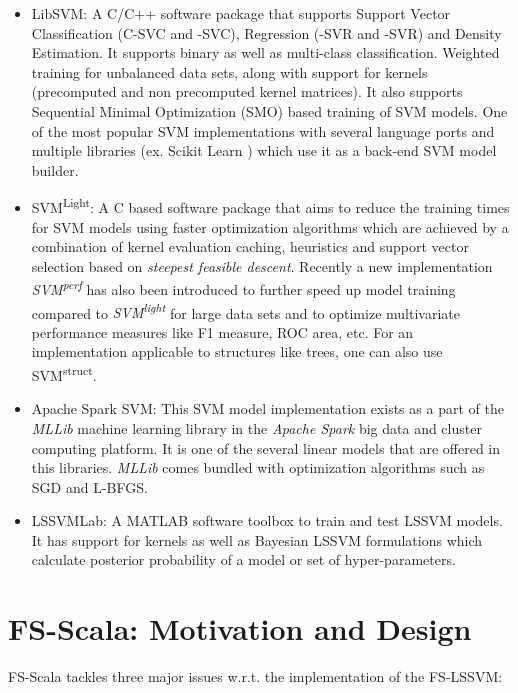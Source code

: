 \begin{itemize}
\item LibSVM: A C/C++ software package that supports Support Vector Classification (C-SVC and \textnu-SVC),  Regression (\textepsilon-SVR and \textnu-SVR) and Density Estimation. It supports binary as well as multi-class classification. Weighted training for unbalanced data sets, along with support for kernels (precomputed and non precomputed kernel matrices). It also supports Sequential Minimal Optimization (SMO) based training of SVM models. One of the most popular SVM implementations with several language ports and multiple libraries (ex. Scikit Learn \cite{scikit-learn}) which use it as a back-end SVM model builder. 

\item SVM\textsuperscript{Light}: A C based software package that aims to reduce the training times for SVM models using faster optimization algorithms which are achieved by a combination of kernel evaluation caching, heuristics and support vector selection based on \textit{steepest feasible descent}. Recently a new implementation \textit{SVM\textsuperscript{perf}} has also been introduced to further speed up model training compared to \textit{SVM\textsuperscript{light}} for large data sets and to optimize multivariate performance measures like F1 measure, ROC area, etc. For an implementation applicable to structures like trees, one can also use SVM\textsuperscript{struct}. 

\item Apache Spark SVM: This SVM model implementation exists as a part of the \textit{MLLib} machine learning library in the \textit{Apache Spark} big data and cluster computing platform. It is one of the several linear models that are offered in this libraries. \textit{MLLib} comes bundled with optimization algorithms such as SGD and L-BFGS.


\item LSSVMLab: A MATLAB software toolbox to train and test LSSVM models. It has support for kernels as well as Bayesian LSSVM formulations which calculate posterior probability of a model or set of hyper-parameters.

\end{itemize}

\section{FS-Scala: Motivation and Design}
FS-Scala tackles three major issues w.r.t. the implementation of the FS-LSSVM:

